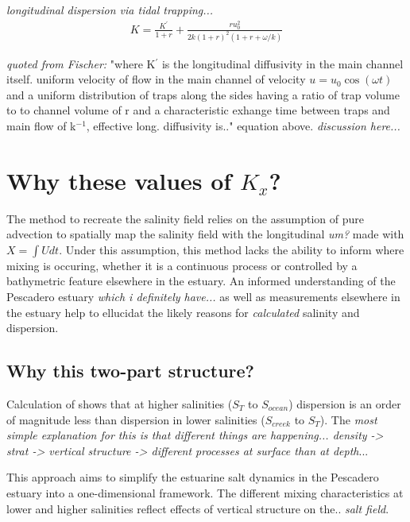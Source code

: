 \emph{longitudinal dispersion via tidal trapping...}
\begin{eqnarray}
K = \frac{K^{'}}{1+r} + \frac{ru_0^2}{2k(1+r)^2(1+r+\omega / k)} \label{eq:KxOkubo}
\end{eqnarray}

\emph{quoted from Fischer:} "where K$^{'}$ is the longitudinal diffusivity in the main channel itself. uniform velocity of flow in the main channel of velocity $u = u_0 \cos(\omega t)$ and a uniform distribution of traps along the sides having a ratio of trap volume to to channel volume of r and a characteristic exhange time between traps and main flow of k$^{-1}$, effective long. diffusivity is.." equation above. \emph{discussion here...}


\section{Why these values of $K_x$?}

The method to recreate the salinity field relies on the assumption of pure advection to spatially map the salinity field with the longitudinal \emph{um?} made with $X = \int{U}dt$. Under this assumption, this method lacks the ability to inform where mixing is occuring, whether it is a continuous process or controlled by a bathymetric feature elsewhere in the estuary. An informed understanding of the Pescadero estuary \emph{which i definitely have...} as well as measurements elsewhere in the estuary help to ellucidat the likely reasons for \emph{calculated} salinity and dispersion. 

\subsection{Why this two-part structure?}

Calculation of  shows that at higher salinities ($S_T$ to $S_{ocean}$) dispersion is an order of magnitude less than dispersion in lower salinities ($S_{creek}$ to $S_T$). The \emph{most simple explanation for this is that different things are happening... density -> strat -> vertical structure -> different processes at surface than at depth}... 

This approach aims to simplify the estuarine salt dynamics in the Pescadero estuary into a one-dimensional framework. The different mixing characteristics at lower and higher salinities reflect effects of vertical structure on the.. \emph{salt field}. 

